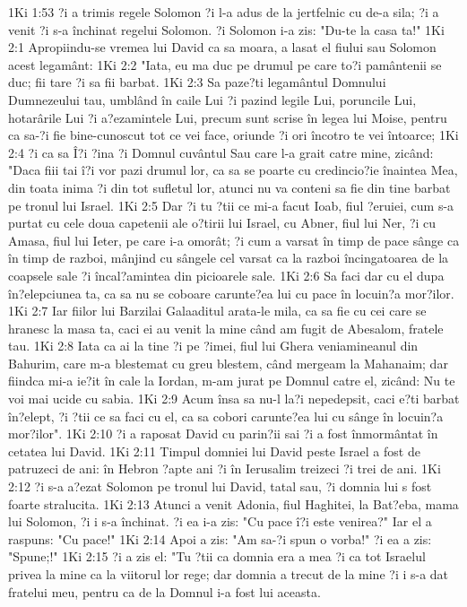 1Ki 1:53  ?i a trimis regele Solomon ?i l-a adus de la jertfelnic cu de-a sila; ?i a venit ?i s-a închinat regelui Solomon. ?i Solomon i-a zis: "Du-te la casa ta!"
1Ki 2:1  Apropiindu-se vremea lui David ca sa moara, a lasat el fiului sau Solomon acest legamânt:
1Ki 2:2  "Iata, eu ma duc pe drumul pe care to?i pamântenii se duc; fii tare ?i sa fii barbat.
1Ki 2:3  Sa paze?ti legamântul Domnului Dumnezeului tau, umblând în caile Lui ?i pazind legile Lui, poruncile Lui, hotarârile Lui ?i a?ezamintele Lui, precum sunt scrise în legea lui Moise, pentru ca sa-?i fie bine-cunoscut tot ce vei face, oriunde ?i ori încotro te vei întoarce;
1Ki 2:4  ?i ca sa Î?i ?ina ?i Domnul cuvântul Sau care l-a grait catre mine, zicând: "Daca fiii tai î?i vor pazi drumul lor, ca sa se poarte cu credincio?ie înaintea Mea, din toata inima ?i din tot sufletul lor, atunci nu va conteni sa fie din tine barbat pe tronul lui Israel.
1Ki 2:5  Dar ?i tu ?tii ce mi-a facut Ioab, fiul ?eruiei, cum s-a purtat cu cele doua capetenii ale o?tirii lui Israel, cu Abner, fiul lui Ner, ?i cu Amasa, fiul lui Ieter, pe care i-a omorât; ?i cum a varsat în timp de pace sânge ca în timp de razboi, mânjind cu sângele cel varsat ca la razboi încingatoarea de la coapsele sale ?i încal?amintea din picioarele sale.
1Ki 2:6  Sa faci dar cu el dupa în?elepciunea ta, ca sa nu se coboare carunte?ea lui cu pace în locuin?a mor?ilor.
1Ki 2:7  Iar fiilor lui Barzilai Galaaditul arata-le mila, ca sa fie cu cei care se hranesc la masa ta, caci ei au venit la mine când am fugit de Abesalom, fratele tau.
1Ki 2:8  Iata ca ai la tine ?i pe ?imei, fiul lui Ghera veniamineanul din Bahurim, care m-a blestemat cu greu blestem, când mergeam la Mahanaim; dar fiindca mi-a ie?it în cale la Iordan, m-am jurat pe Domnul catre el, zicând: Nu te voi mai ucide cu sabia.
1Ki 2:9  Acum însa sa nu-l la?i nepedepsit, caci e?ti barbat în?elept, ?i ?tii ce sa faci cu el, ca sa cobori carunte?ea lui cu sânge în locuin?a mor?ilor".
1Ki 2:10  ?i a raposat David cu parin?ii sai ?i a fost înmormântat în cetatea lui David.
1Ki 2:11  Timpul domniei lui David peste Israel a fost de patruzeci de ani: în Hebron ?apte ani ?i în Ierusalim treizeci ?i trei de ani.
1Ki 2:12  ?i s-a a?ezat Solomon pe tronul lui David, tatal sau, ?i domnia lui s fost foarte stralucita.
1Ki 2:13  Atunci a venit Adonia, fiul Haghitei, la Bat?eba, mama lui Solomon, ?i i s-a închinat. ?i ea i-a zis: "Cu pace î?i este venirea?" Iar el a raspuns: "Cu pace!"
1Ki 2:14  Apoi a zis: "Am sa-?i spun o vorba!" ?i ea a zis: "Spune;!"
1Ki 2:15  ?i a zis el: "Tu ?tii ca domnia era a mea ?i ca tot Israelul privea la mine ca la viitorul lor rege; dar domnia a trecut de la mine ?i i s-a dat fratelui meu, pentru ca de la Domnul i-a fost lui aceasta.
